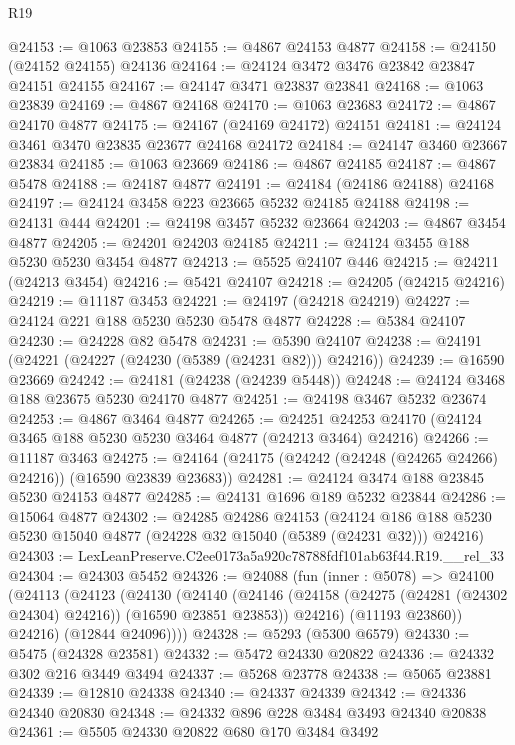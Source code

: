 \begin{lexlean}{R19}
\begin{coremodule}
@24153 := @1063 @23853
@24155 := @4867 @24153 @4877
@24158 := @24150 (@24152 @24155) @24136
@24164 := @24124 @3472 @3476 @23842 @23847 @24151 @24155
@24167 := @24147 @3471 @23837 @23841
@24168 := @1063 @23839
@24169 := @4867 @24168
@24170 := @1063 @23683
@24172 := @4867 @24170 @4877
@24175 := @24167 (@24169 @24172) @24151
@24181 := @24124 @3461 @3470 @23835 @23677 @24168 @24172
@24184 := @24147 @3460 @23667 @23834
@24185 := @1063 @23669
@24186 := @4867 @24185
@24187 := @4867 @5478
@24188 := @24187 @4877
@24191 := @24184 (@24186 @24188) @24168
@24197 := @24124 @3458 @223 @23665 @5232 @24185 @24188
@24198 := @24131 @444
@24201 := @24198 @3457 @5232 @23664
@24203 := @4867 @3454 @4877
@24205 := @24201 @24203 @24185
@24211 := @24124 @3455 @188 @5230 @5230 @3454 @4877
@24213 := @5525 @24107 @446
@24215 := @24211 (@24213 @3454)
@24216 := @5421 @24107
@24218 := @24205 (@24215 @24216)
@24219 := @11187 @3453
@24221 := @24197 (@24218 @24219)
@24227 := @24124 @221 @188 @5230 @5230 @5478 @4877
@24228 := @5384 @24107
@24230 := @24228 @82 @5478
@24231 := @5390 @24107
@24238 := @24191 (@24221 (@24227 (@24230 (@5389 (@24231 @82))) @24216))
@24239 := @16590 @23669
@24242 := @24181 (@24238 (@24239 @5448))
@24248 := @24124 @3468 @188 @23675 @5230 @24170 @4877
@24251 := @24198 @3467 @5232 @23674
@24253 := @4867 @3464 @4877
@24265 := @24251 @24253 @24170 (@24124 @3465 @188 @5230 @5230 @3464 @4877 (@24213 @3464) @24216)
@24266 := @11187 @3463
@24275 := @24164 (@24175 (@24242 (@24248 (@24265 @24266) @24216)) (@16590 @23839 @23683))
@24281 := @24124 @3474 @188 @23845 @5230 @24153 @4877
@24285 := @24131 @1696 @189 @5232 @23844
@24286 := @15064 @4877
@24302 := @24285
    @24286
    @24153
    (@24124 @186 @188 @5230 @5230 @15040 @4877 (@24228 @32 @15040 (@5389 (@24231 @32))) @24216)
@24303 := LexLeanPreserve.C2ee0173a5a920c78788fdf101ab63f44.R19.__rel_33
@24304 := @24303 @5452
@24326 := @24088
    (fun (inner : @5078) =>
    @24100
      (@24113
        (@24123
          (@24130
            (@24140
              (@24146
                (@24158 (@24275 (@24281 (@24302 @24304) @24216)) (@16590 @23851 @23853))
                @24216)
              (@11193 @23860))
            @24216)
          (@12844 @24096))))
@24328 := @5293 (@5300 @6579)
@24330 := @5475 (@24328 @23581)
@24332 := @5472 @24330 @20822
@24336 := @24332 @302 @216 @3449 @3494
@24337 := @5268 @23778
@24338 := @5065 @23881
@24339 := @12810 @24338
@24340 := @24337 @24339
@24342 := @24336 @24340 @20830
@24348 := @24332 @896 @228 @3484 @3493 @24340 @20838
@24361 := @5505
    @24330
    @20822
    @680
    @170
    @3484
    @3492

\end{coremodule}
\end{lexlean}
